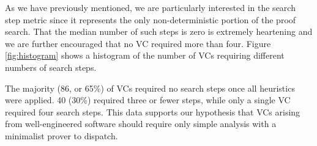 As we have previously mentioned, we are particularly interested in the search step metric since it represents the only non-deterministic portion of the proof search.  That the median number of such steps is zero is extremely heartening and we are further encouraged that no VC required more than four.  Figure \ref{fig:histogram} shows a histogram of the number of VCs requiring different numbers of search steps.

The majority (86, or 65\%) of VCs required no search steps once all heuristics were applied.  40 (30\%) required three or fewer steps, while only a single VC required four search steps.  This data supports our hypothesis that VCs arising from well-engineered software should require only simple analysis with a minimalist prover to dispatch.
